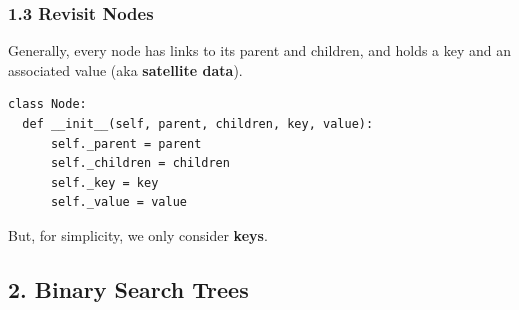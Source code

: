 \documentclass[aspectratio=169, 14pt]{beamer}
\begin{document}
\begin{frame}[fragile]
	\frametitle{1.3 Revisit Nodes}

	Generally, every node has links to its parent and children, and holds a \alert{key} and an associated \alert{value} (aka \textbf{satellite data}).

	\begin{verbatim}
class Node:
  def __init__(self, parent, children, key, value):
      self._parent = parent
      self._children = children
      self._key = key
      self._value = value
  \end{verbatim}

	But, for simplicity, we only consider \textbf{keys}.
\end{frame}

\begin{frame}

	\section{\textcolor{darkmidnightblue}{2. Binary Search Trees}}

\end{frame}
\end{document}
